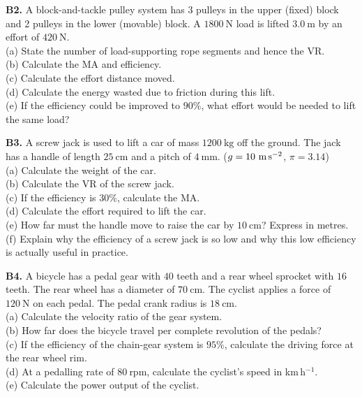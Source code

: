 \begin{exercisebox}[10]
\vspace{0.4cm}

\textbf{B2.} A block-and-tackle pulley system has
3 pulleys in the upper (fixed) block and 2 pulleys
in the lower (movable) block. A $1800\ \text{N}$
load is lifted $3.0\ \text{m}$ by an effort of
$420\ \text{N}$.\\[4pt]
(a) State the number of load-supporting rope segments
and hence the VR.\\
(b) Calculate the MA and efficiency.\\
(c) Calculate the effort distance moved.\\
(d) Calculate the energy wasted due to friction during
this lift.\\
(e) If the efficiency could be improved to $90\%$,
what effort would be needed to lift the same load?
\hfill{}

\vspace{0.4cm}

\textbf{B3.} A screw jack is used to lift a car of
mass $1200\ \text{kg}$ off the ground.
The jack has a handle of length $25\ \text{cm}$
and a pitch of $4\ \text{mm}$.
($g = 10\ \text{m\,s}^{-2}$, $\pi = 3.14$)\\[4pt]
(a) Calculate the weight of the car.\\
(b) Calculate the VR of the screw jack.\\
(c) If the efficiency is $30\%$, calculate the MA.\\
(d) Calculate the effort required to lift the car.\\
(e) How far must the handle move to raise the car
by $10\ \text{cm}$? Express in metres.\\
(f) Explain why the efficiency of a screw jack is
so low and why this low efficiency is actually
useful in practice.
\hfill{}

\vspace{0.4cm}

\textbf{B4.} A bicycle has a pedal gear with
$40$ teeth and a rear wheel sprocket with $16$ teeth.
The rear wheel has a diameter of $70\ \text{cm}$.
The cyclist applies a force of $120\ \text{N}$ on
each pedal. The pedal crank radius is $18\ \text{cm}$.\\[4pt]
(a) Calculate the velocity ratio of the gear system.\\
(b) How far does the bicycle travel per complete
revolution of the pedals?\\
(c) If the efficiency of the chain-gear system is
$95\%$, calculate the driving force at the rear
wheel rim.\\
(d) At a pedalling rate of $80\ \text{rpm}$,
calculate the cyclist's speed in km\,h$^{-1}$.\\
(e) Calculate the power output of the cyclist.
\hfill{}


\end{exercisebox}
